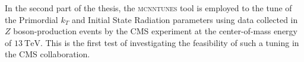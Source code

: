 \medskip

In the second part of the thesis, the \textsc{mcnntunes} tool is employed to the tune of the Primordial $k_T$ and Initial State Radiation parameters using data collected in $Z$ boson-production events by the CMS experiment at the center-of-mass energy of $13\ \mathrm{TeV}$. This is the first test of investigating the feasibility of such a tuning in the CMS collaboration.


%

